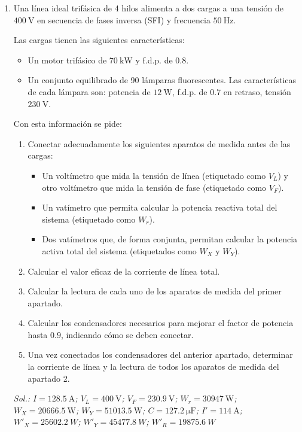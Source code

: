 \begin{enumerate}
\item Una línea ideal trifásica de 4 hilos alimenta a dos cargas a una
  tensión de $\SI{400}{\volt}$ en secuencia de fases inversa (SFI) y
  frecuencia $\SI{50}{\hertz}$.

  Las cargas tienen las siguientes características:

  \begin{itemize}
  \item Un motor trifásico de $\SI{70}{\kilo\watt}$ y f.d.p. de $0.8$.
  \item Un conjunto equilibrado de 90 lámparas fluorescentes. Las
    características de cada lámpara son: potencia de $\SI{12}{\watt}$,
    f.d.p. de $0.7$ en retraso, tensión $\SI{230}{\volt}$.
  \end{itemize}

  Con esta información se pide:

  \begin{enumerate}
  \item Conectar adecuadamente los siguientes aparatos de medida antes
    de las cargas:
    \begin{itemize}
    \item Un voltímetro que mida la tensión de línea (etiquetado como
      $V_L$) y otro voltímetro que mida la tensión de fase (etiquetado
      como $V_F$).
    \item Un vatímetro que permita calcular la potencia reactiva total
      del sistema (etiquetado como $W_r$).
    \item Dos vatímetros que, de forma conjunta, permitan calcular la
      potencia activa total del sistema (etiquetados como $W_X$ y
      $W_Y$).
    \end{itemize}
  \item Calcular el valor eficaz de la corriente de línea total.
  \item Calcular la lectura de cada uno de los aparatos de medida del
    primer apartado.
  \item Calcular los condensadores necesarios para mejorar el factor
    de potencia hasta $0.9$, indicando cómo se deben conectar.
  \item Una vez conectados los condensadores del anterior apartado,
    determinar la corriente de línea y la lectura de todos los
    aparatos de medida del apartado 2.
  \end{enumerate}

  \emph{Sol.:\; $I = \qty{128.5}{\ampere}$;\; $V_L = \qty{400}{\volt}$;\;
    $V_F = \qty{230.9}{\volt}$;\; $W_r = \qty{30947}{\watt}$;\;
    $W_X = \qty{20666.5}{\watt}$;\; $W_Y = \qty{51013.5}{\watt}$;\;
    $C=\SI{127.2}{\micro\farad}$;\; $I' = \qty{114}{\ampere}$;\;
    $W'_X = \SI{25602.2}{W}$;\; $W'_Y = \SI{45477.8}{W}$;\;
    $W'_R = \SI{19875.6}{W}$}


\end{enumerate}
